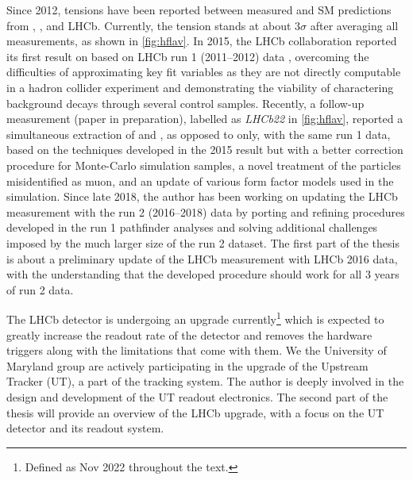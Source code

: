 Since 2012, tensions have been reported between measured \RDX and SM
predictions from \babar, \belle, and LHCb.
Currently, the tension stands at about $3 \sigma$ after averaging all
measurements,
as shown in \cref{fig:hflav}.
In 2015, the LHCb collaboration reported its first result on \RDst
based on LHCb run 1 (2011--2012) data
\cite{PhysRevLett.115.111803},
overcoming the difficulties of approximating key fit variables
as they are not directly computable in a hadron collider experiment
and demonstrating the viability of charactering background decays through
several control samples.
Recently, a follow-up measurement (paper in preparation),
labelled as \emph{LHCb22} in \cref{fig:hflav},
reported a simultaneous extraction of \RD and \RDst,
as opposed to \RDst only,
with the same run 1 data,
based on the techniques developed in the 2015 result but with
a better correction procedure for Monte-Carlo simulation samples,
a novel treatment of the particles misidentified as muon,
and an update of various form factor models used in the simulation.
Since late 2018,
the author has been working on updating the LHCb \RDX measurement with the run 2
(2016--2018) data by porting and refining procedures developed in the run 1
pathfinder analyses and solving additional challenges imposed by the much larger
size of the run 2 dataset.
The first part of the thesis is about a preliminary update of the LHCb \RDX
measurement with LHCb 2016 data,
with the understanding that the developed procedure should work for all 3 years
of run 2 data.

The LHCb detector is undergoing an upgrade currently\footnote{
    Defined as Nov 2022 throughout the text.
} which is expected to greatly increase
the readout rate of the detector and removes the hardware triggers along
with the limitations that come with them.
We the University of Maryland group are actively participating in the upgrade
of the Upstream Tracker (UT), a part of the tracking system.
The author is deeply involved in the design and development of the UT readout
electronics.
The second part of the thesis will provide an overview of the LHCb upgrade, with
a focus on the UT detector and its readout system.

